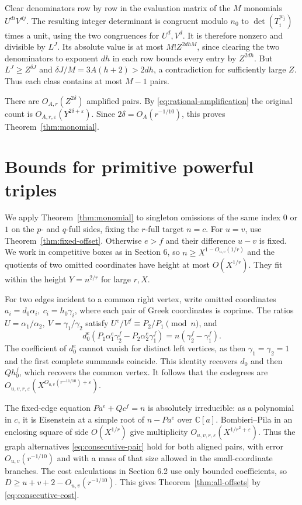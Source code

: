 \documentclass[11pt,reqno]{amsart}
\newcommand{\eps}{\varepsilon}
\newcommand{\C}{\mathbb C}
\begin{document}
Clear denominators row by row in the evaluation matrix of the
\(M\) monomials \(U^{di}V^{dj}\). The resulting integer determinant
is congruent modulo \(n_0\) to \(\det(T_i^{w_j})\) times a unit,
using the two congruences for \(U^d,V^d\).
It is therefore nonzero and divisible by \(L^J\).
Its absolute value is at most \(M! Z^{2dhM}\), since clearing
the two denominators to exponent \(dh\) in each row bounds every
entry by \(Z^{2dh}\). But \(L^J\ge Z^{\delta J}\) and
\(\delta J/M=3A(h+2)>2dh\), a contradiction for sufficiently
large \(Z\). Thus each class contains at most \(M-1\) pairs.

There are \(O_{A,r}(Z^{2\delta})\) amplified pairs.
By \eqref{eq:rational-amplification} the original count is
\(O_{A,r,\eps}(Y^{2\delta+\eps})\).
Since \(2\delta=O_A(r^{-1/10})\), this proves
Theorem~\ref{thm:monomial}.

\section{Bounds for primitive powerful triples}
We apply Theorem~\ref{thm:monomial} to singleton omissions of
the same index \(0\) or \(1\) on the \(p\)- and \(q\)-full sides,
fixing the \(r\)-full target \(n=c\). For \(u=v\), use
Theorem~\ref{thm:fixed-offset}. Otherwise \(e>f\) and their
difference \(u-v\) is fixed. We work in competitive boxes as in
Section 6, so \(n\ge X^{1-O_{u,v}(1/r)}\) and the quotients of
two omitted coordinates have height at most \(O(X^{1/r})\).
They fit within the height \(Y=n^{2/r}\) for large \(r,X\).

For two edges incident to a common right vertex, write omitted
coordinates \(a_i=d_0\alpha_i,\ c_i=h_0\gamma_i\), where each
pair of Greek coordinates is coprime. The ratios
\(U=\alpha_1/\alpha_2,\ V=\gamma_1/\gamma_2\) satisfy
\(U^e/V^f\equiv P_2/P_1\pmod n\), and
\[
 d_0^e(P_1\alpha_1^e\gamma_2^f-P_2\alpha_2^e\gamma_1^f)
                        =n(\gamma_2^f-\gamma_1^f).
\]
The coefficient of \(d_0^e\) cannot vanish for distinct left
vertices, as then \(\gamma_1=\gamma_2=1\) and the first complete
summands coincide. This identity recovers \(d_0\) and then
\(Qh_0^f\), which recovers the common vertex.
It follows that the codegrees are
\(O_{u,v,r,\eps}(X^{O_{u,v}(r^{-11/10})+\eps})\).

The fixed-edge equation \(Pa^e+Qc^f=n\) is absolutely irreducible:
as a polynomial in \(c\), it is Eisenstein at a simple root of
\(n-Pa^e\) over \(\C[a]\). Bombieri--Pila
\cite[Theorem~5]{BP} in an enclosing square of side \(O(X^{1/r})\)
give multiplicity \(O_{u,v,r,\eps}(X^{1/r^2+\eps})\).
Thus the graph alternatives \eqref{eq:consecutive-pair}
hold for both aligned pairs, with error \(O_{u,v}(r^{-1/10})\)
and with a mass of that size allowed in the small-coordinate
branches. The cost calculations in Section 6.2 use only
bounded coefficients, so \(D\ge u+v+2-O_{u,v}(r^{-1/10})\).
This gives Theorem~\ref{thm:all-offsets} by
\eqref{eq:consecutive-cost}.
\end{document}
